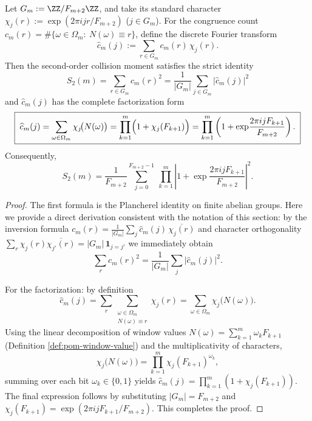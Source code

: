 \begin{proposition}\label{prop:pom-s2-plancherel}
Let \(G_m:=\ZZ/F_{m+2}\ZZ\), and take its standard character
\(
\chi_j(r):=\exp(2\pi i jr/F_{m+2})
\)
(\(j\in G_m\)). For the congruence count \(c_m(r)=\#\{\omega\in\Omega_m:\ N(\omega)\equiv r\}\), define the discrete Fourier transform
\[
\widehat c_m(j):=\sum_{r\in G_m} c_m(r)\,\chi_j(r).
\]
Then the second-order collision moment satisfies the strict identity
\[
\boxed{\;
S_2(m)=\sum_{r\in G_m}c_m(r)^2=\frac{1}{|G_m|}\sum_{j\in G_m}\bigl|\widehat c_m(j)\bigr|^2\;}
\]
and \(\widehat c_m(j)\) has the complete factorization form
\[
\boxed{\;
\widehat c_m(j)=\sum_{\omega\in\Omega_m}\chi_j\!\bigl(N(\omega)\bigr)
=\prod_{k=1}^m\Bigl(1+\chi_j(F_{k+1})\Bigr)
=\prod_{k=1}^m\left(1+\exp\!\frac{2\pi i j F_{k+1}}{F_{m+2}}\right).\;}
\]
Consequently,
\[
S_2(m)
=\frac{1}{F_{m+2}}\sum_{j=0}^{F_{m+2}-1}\ \prod_{k=1}^m\left|1+\exp\!\frac{2\pi i j F_{k+1}}{F_{m+2}}\right|^2.
\]
\end{proposition}
\begin{proof}
The first formula is the Plancherel identity on finite abelian groups. Here we provide a direct derivation consistent with the notation of this section: by the inversion formula
\(
c_m(r)=\frac{1}{|G_m|}\sum_{j}\widehat c_m(j)\,\overline{\chi_j(r)}
\)
and character orthogonality
\(
\sum_{r}\chi_j(r)\overline{\chi_{j'}(r)}=|G_m|\,\mathbf{1}_{j=j'}
\)
we immediately obtain
\[
\sum_{r}c_m(r)^2
=\frac{1}{|G_m|}\sum_{j}|\widehat c_m(j)|^2.
\]

For the factorization: by definition
\[
\widehat c_m(j)
=\sum_{r}\sum_{\substack{\omega\in\Omega_m\\N(\omega)\equiv r}}\chi_j(r)
=\sum_{\omega\in\Omega_m}\chi_j\!\bigl(N(\omega)\bigr).
\]
Using the linear decomposition of window values \(N(\omega)=\sum_{k=1}^m \omega_k F_{k+1}\) (Definition \ref{def:pom-window-value}) and the multiplicativity of characters,
\[
\chi_j\!\bigl(N(\omega)\bigr)
=\prod_{k=1}^m \chi_j(F_{k+1})^{\omega_k},
\]
summing over each bit \(\omega_k\in\{0,1\}\) yields
\(
\widehat c_m(j)=\prod_{k=1}^m(1+\chi_j(F_{k+1}))
\).
The final expression follows by substituting \(|G_m|=F_{m+2}\) and \(\chi_j(F_{k+1})=\exp(2\pi i jF_{k+1}/F_{m+2})\). This completes the proof.
\end{proof}

